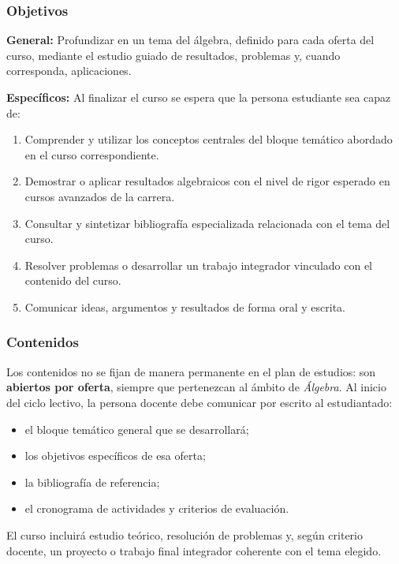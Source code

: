 \begin{refsection}
\subsubsection*{Objetivos}

\textbf{General:} Profundizar en un tema del álgebra, definido para cada oferta del curso, mediante el estudio guiado de resultados, problemas y, cuando corresponda, aplicaciones.

\textbf{Específicos:} Al finalizar el curso se espera que la persona estudiante sea capaz de:

\begin{enumerate}
\item Comprender y utilizar los conceptos centrales del bloque temático abordado en el curso correspondiente.
\item Demostrar o aplicar resultados algebraicos con el nivel de rigor esperado en cursos avanzados de la carrera.
\item Consultar y sintetizar bibliografía especializada relacionada con el tema del curso.
\item Resolver problemas o desarrollar un trabajo integrador vinculado con el contenido del curso.
\item Comunicar ideas, argumentos y resultados de forma oral y escrita.
\end{enumerate}

\subsubsection*{Contenidos}

Los contenidos no se fijan de manera permanente en el plan de estudios: son \textbf{abiertos por oferta}, siempre que pertenezcan al ámbito de \emph{Álgebra}. Al inicio del ciclo lectivo, la persona docente debe comunicar por escrito al estudiantado:

\begin{itemize}
\item el bloque temático general que se desarrollará;
\item los objetivos específicos de esa oferta;
\item la bibliografía de referencia;
\item el cronograma de actividades y criterios de evaluación.
\end{itemize}

El curso incluirá estudio teórico, resolución de problemas y, según criterio docente, un proyecto o trabajo final integrador coherente con el tema elegido.


\end{refsection}
